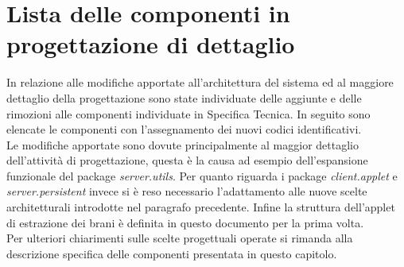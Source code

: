 \section{Lista delle componenti in progettazione di dettaglio}
In relazione alle modifiche apportate all'architettura del sistema ed al
maggiore dettaglio della progettazione sono state individuate delle aggiunte e
delle rimozioni alle componenti individuate in Specifica Tecnica. In seguito
sono elencate le componenti con l'assegnamento dei nuovi codici
identificativi.\\
Le modifiche apportate sono dovute principalmente al maggior dettaglio
dell'attivit\`a di progettazione, questa \`e la causa ad esempio dell'espansione
funzionale del package \emph{server.utils}. Per quanto riguarda i package
\emph{client.applet} e \emph{server.persistent} invece si \`e reso necessario l'adattamento alle nuove scelte architetturali introdotte nel paragrafo
precedente. Infine la struttura dell'applet di estrazione dei brani \`e definita
in questo documento per la prima volta.\\
Per ulteriori chiarimenti sulle scelte progettuali operate si rimanda
alla descrizione specifica delle componenti presentata in questo capitolo.
